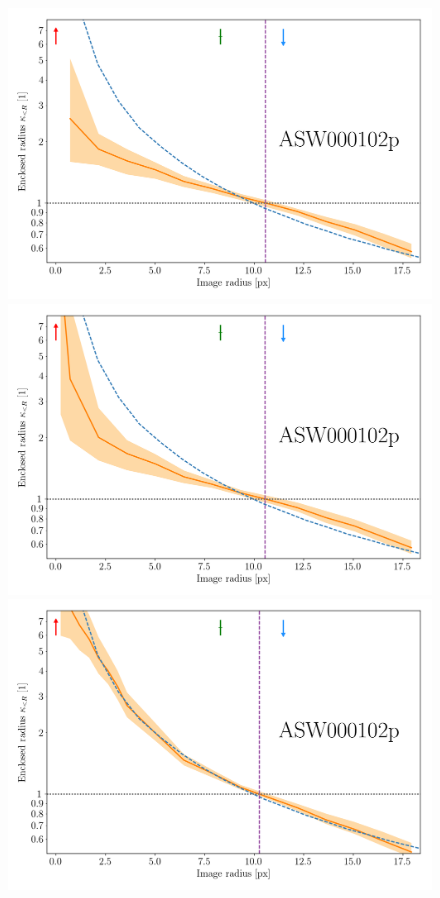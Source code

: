 \begin{figure}
  \includegraphics[width=.9\linewidth]{img/hires_comparison/ASW000102p_6941_11_hires_comparison}
  \includegraphics[width=.9\linewidth]{img/hires_comparison/ASW000102p_6941_13_hires_comparison}
  \includegraphics[width=.9\linewidth]{img/hires_comparison/ASW000102p_6941_33_hires_comparison}

\end{figure}
